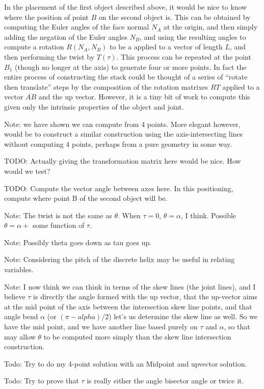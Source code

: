 \documentclass[11pt]{article}
\begin{document}
In the placement of the first object described above, it would
be nice to know where the position of point $B$ on the second
object is. This can be obtained by computing the Euler angles
of the face normal $N_A$ at the origin, and then simply
adding the negation of the Euler angles $N_B$, and using
the resulting angles to compute a rotation $R(N_A,N_B)$ to be a applied to
a vector of length $L$, and then performing the twist by $T(\tau)$. This process can be repeated at
the point $B_1$ (though no longer at the axis) to generate
four or more points. In fact the entire process of constructing
the stack could be thought of a series of ``rotate then translate'' steps by the composition of the rotation matrixes $RT$ applied to a vector $\overline{AB}$ and the up vector.
However, it is a tiny bit of work to compute this given only
the intrinsic properties of the object and joint.

Note: we have shown we can compute from 4 points.
More elegant however, would be to construct a similar
construction using the axis-intersecting lines without
computing 4 points, perhaps from a pure geometry in some way.

TODO: Actually giving the transformation matrix here would be nice.
How would we test? 

TODO: Compute the vector angle between axes here. In this positioning, compute where
point B of the second object will be.

Note: The twist is not the same as $\theta$. When $\tau = 0$, $\theta = \alpha$,
I think. Possible $\theta = \alpha + $ some function of $\tau$.

Note: Possibly theta goes down as tau goes up.

Note: Considering the pitch of the discrete helix may be useful
in relating variables.

Note: I now think we can think in terms of the skew lines (the
joint lines), and I believe $\tau$ is directly the angle
formed with the up vector, that the up-vector aims at
the mid point of the axis between the intersection skew line
points, and that angle bend $\alpha$ (or $(\pi - alpha)/2$)
let's us determine the skew line as well.  So we have
the mid point, and we have another line based purely
on $\tau$ and $\alpha$, so that may allow $\theta$
to be computed more simply than the skew line intersection
construction.

Todo: Try to do my 4-point solution with an Midpoint and
upvector solution.

Todo: Try to prove that $\tau$ is really either the
angle bisector angle or twice it.
\end{document}
